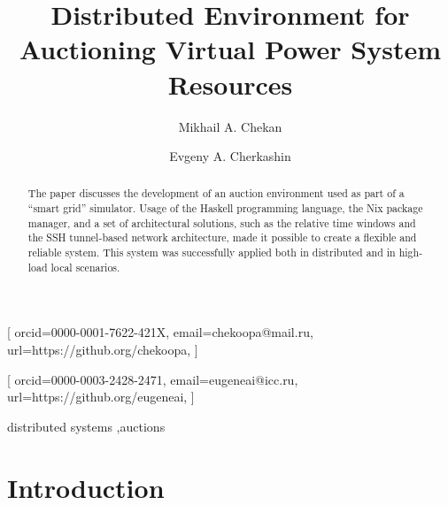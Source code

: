 \documentclass[
]{ceurart}
\begin{document}


\title{Distributed Environment for Auctioning Virtual Power System Resources}
\author[1,2]{Mikhail A. Chekan}[%
orcid=0000-0001-7622-421X,
email=chekoopa@mail.ru,
url=https://github.org/chekoopa,
]
\author[1,2]{Evgeny A. Cherkashin}[%
orcid=0000-0003-2428-2471,
email=eugeneai@icc.ru,
url=https://github.org/eugeneai,
]
\address[1]{Matrosov Institute for System Dynamics and Control Theory of Siberian Branch of Russian Academy of Sciences, 134 Lermontov St, Irkutsk, 664033, Russian Federation}

\address[2]{Institute for Mathematics and Information Technologies, Irkutsk State University, 20~Gagarina Bulv, Irkutsk, 664003, Russian Federation}


\begin{abstract}
  The paper discusses the development of an auction environment used as part of a ``smart grid'' simulator. Usage of the Haskell programming language, the Nix package manager, and a set of architectural solutions, such as the relative time windows and the SSH tunnel-based network architecture, made it possible to create a flexible and reliable system. This system was successfully applied both in distributed and in high-load local scenarios.
\end{abstract}

\begin{keywords}
  distributed systems \sep auctions
\end{keywords}

\maketitle

\section*{Introduction}
\label{sec:into}
\end{document}
